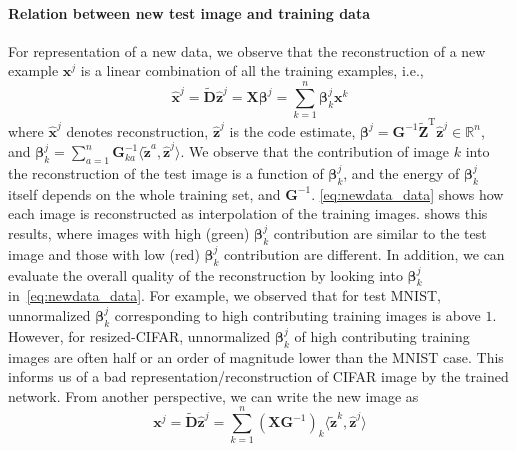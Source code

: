 \documentclass[10pt]{article} %
\newcommand{\R}{\mathbb{R}} %
\newcommand{\D}{{\bm D}}
\newcommand{\Z}{{\bm Z}}
\newcommand{\Xx}{{\bm X}}
\newcommand{\G}{{\bm G}}
\newcommand{\boldbeta}{{\bm \beta}}
\newcommand{\x}{{\bm x}}
\newcommand{\z}{{\bm z}}
\begin{document}
\paragraph{Relation between new test image and training data} For representation of a new data, we observe that the reconstruction of a new example $\x^j$ is a linear combination of all the training examples, i.e.,
\vspace{-3mm}
\begin{equation}\label{eq:newdata_data}
\hat \x^j = \tilde \D \hat \z^{j} = \Xx \boldbeta^j = \sum_{k=1}^n \boldbeta^j_k \x^k
\end{equation}
%
where $\hat \x^j$ denotes reconstruction, $\hat \z^j$ is the code estimate, $\boldbeta^j = \G^{-1} \tilde \Z^{\text{T}} \hat \z^{j} \in \R^{n}$, and $\boldbeta^j_k = \sum_{a=1}^n \G^{-1}_{ka} \langle \tilde \z^a, \hat \z^j\rangle$. We observe that the contribution of image $k$ into the reconstruction of the test image is a function of $\boldbeta^j_k$, and the energy of $\boldbeta^j_k$ itself depends on the whole training set, and $\G^{-1}$. \eqref{eq:newdata_data} shows how each image is reconstructed as interpolation of the training images.  shows this results, where images with high (green) $\boldbeta^j_k$ contribution are similar to the test image and those with low (red) $\boldbeta^j_k$ contribution are different. In addition, we can evaluate the overall quality of the reconstruction by looking into $\boldbeta_k^j$ in~\eqref{eq:newdata_data}. For example, we observed that for test MNIST, unnormalized $\boldbeta_k^j$ corresponding to high contributing training images is above $1$. However, for resized-CIFAR, unnormalized $\boldbeta_k^j$ of high contributing training images are often half or an order of magnitude lower than the MNIST case. This informs us of a bad representation/reconstruction of CIFAR image by the trained network. From another perspective, we can write the new image as
%
\begin{equation}\label{eq:code_sim_sum}
    \x^j = \tilde \D \hat \z^{j} =  \sum_{k=1}^n (\Xx \G^{-1})_k \langle \tilde \z^{k}, \hat \z^j \rangle
\end{equation}
%
%
\end{document}
